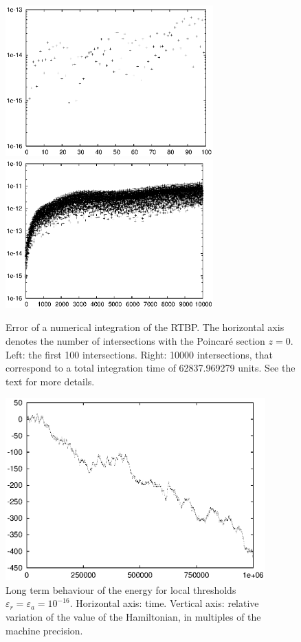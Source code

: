 \documentclass[12pt,twoside]{article}
\begin{document}
\begin{figure}
\includegraphics[width=80mm]{eps/esp-1.eps}\hfill
\includegraphics[width=80mm]{eps/esp-2.eps}
\caption{Error of a numerical integration of the RTBP. The horizontal
axis denotes the number of intersections with the Poincar\'e section
$z=0$. Left: the first 100 intersections. Right: 10000 intersections,
that correspond to a total integration time of 62837.969279 units. See
the text for more details.}
\label{fig:real-error}
\end{figure}

\begin{figure}
\centerline{\includegraphics[width=100mm]{eps/error-h.eps}}
\caption{Long term behaviour of the energy for local thresholds
$\varepsilon_r=\varepsilon_a=10^{-16}$. Horizontal axis:
time. Vertical axis: relative variation of the value of the
Hamiltonian, in multiples of the machine precision.}
\label{fig:error-plot}
\end{figure}
\end{document}
